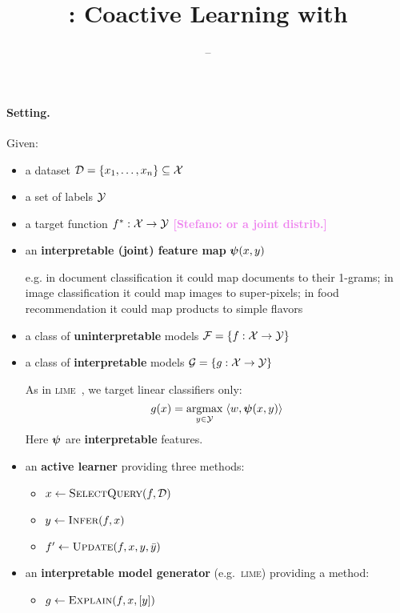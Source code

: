\documentclass[a4paper,12pt]{article}
\title{\mojito: Coactive Learning with \lime}
\author{--}
\newcommand{\stefano}[1]{{\bf \textcolor{violet}{{[Stefano: #1]}}}}
\newcommand{\lime}{\textsc{lime}}
\begin{document}
\maketitle

\paragraph{Setting.} Given:

\begin{itemize}

    \item a dataset $\mathcal{D} = \{ x_1, \ldots, x_n \} \subseteq \mathcal{X}$

    \item a set of labels $\mathcal{Y}$

    \item a target function $f^* : \mathcal{X} \to \mathcal{Y}$ \stefano{or a joint distrib.}

    \item an \textbf{interpretable (joint) feature map} $\boldsymbol{\psi}(x,y)$

        e.g. in document classification it could map documents to their
        1-grams; in image classification it could map images to
        super-pixels; in food recommendation it could map products to
        simple flavors

    \item a class of \textbf{uninterpretable} models $\mathcal{F} = \{ f : \mathcal{X} \to \mathcal{Y} \}$

    \item a class of \textbf{interpretable} models $\mathcal{G} = \{ g : \mathcal{X} \to \mathcal{Y} \}$

        As in \lime~\cite{ribeiro2016should}, we target linear
        classifiers only:
        $$ g(x) = \operatorname*{argmax}_{y\in\mathcal{Y}} \; \langle w, \boldsymbol{\psi}(x,y) \rangle $$
        Here $\boldsymbol{\psi}$ are \textbf{interpretable} features.

    \item an \textbf{active learner} providing three methods:

        \begin{itemize}
            \item $x \gets \textsc{SelectQuery}(f,\mathcal{D})$
            \item $y \gets \textsc{Infer}(f,x)$
            \item $f' \gets \textsc{Update}(f,x,y,\bar{y})$
        \end{itemize}

    \item an \textbf{interpretable model generator} (e.g.~\lime)
        providing a method:

        \begin{itemize}
            \item $g \gets \textsc{Explain}(f,x,[y])$
        \end{itemize}

\end{itemize}
\end{document}
